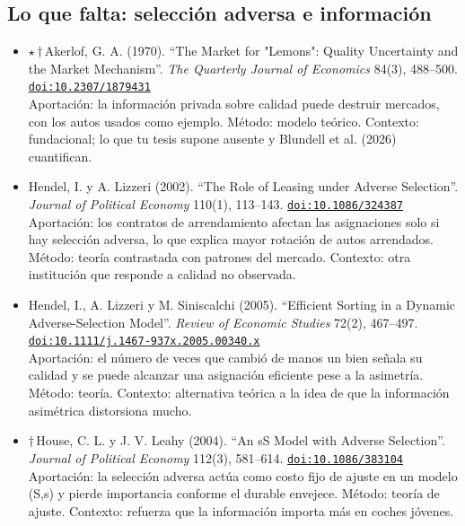 \documentclass[11pt]{article}
\begin{document}
\subsection*{Lo que falta: selección adversa e información}
\begin{itemize}
\item $\star$\,$\dagger$\,Akerlof, G. A. (1970). ``The Market for "Lemons": Quality Uncertainty and the Market Mechanism''. \textit{The Quarterly Journal of Economics} 84(3), 488--500. \href{https://doi.org/10.2307/1879431}{\texttt{doi:10.2307/1879431}}\\
Aportación: la información privada sobre calidad puede destruir mercados, con los autos usados como ejemplo. Método: modelo teórico. Contexto: fundacional; lo que tu tesis supone ausente y Blundell et al. (2026) cuantifican.
\item Hendel, I. y A. Lizzeri (2002). ``The Role of Leasing under Adverse Selection''. \textit{Journal of Political Economy} 110(1), 113--143. \href{https://doi.org/10.1086/324387}{\texttt{doi:10.1086/324387}}\\
Aportación: los contratos de arrendamiento afectan las asignaciones solo si hay selección adversa, lo que explica mayor rotación de autos arrendados. Método: teoría contrastada con patrones del mercado. Contexto: otra institución que responde a calidad no observada.
\item Hendel, I., A. Lizzeri y M. Siniscalchi (2005). ``Efficient Sorting in a Dynamic Adverse-Selection Model''. \textit{Review of Economic Studies} 72(2), 467--497. \href{https://doi.org/10.1111/j.1467-937x.2005.00340.x}{\texttt{doi:10.1111/j.1467-937x.2005.00340.x}}\\
Aportación: el número de veces que cambió de manos un bien señala su calidad y se puede alcanzar una asignación eficiente pese a la asimetría. Método: teoría. Contexto: alternativa teórica a la idea de que la información asimétrica distorsiona mucho.
\item $\dagger$\,House, C. L. y J. V. Leahy (2004). ``An sS Model with Adverse Selection''. \textit{Journal of Political Economy} 112(3), 581--614. \href{https://doi.org/10.1086/383104}{\texttt{doi:10.1086/383104}}\\
Aportación: la selección adversa actúa como costo fijo de ajuste en un modelo (S,s) y pierde importancia conforme el durable envejece. Método: teoría de ajuste. Contexto: refuerza que la información importa más en coches jóvenes.

\end{itemize}
\end{document}
